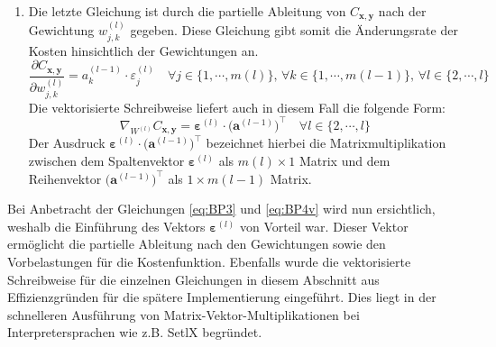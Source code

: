 \begin{enumerate}
\item Die letzte Gleichung ist durch die partielle Ableitung von $C_{\mathbf{x},\mathbf{y}}$ nach der Gewichtung $w_{j,k}^{(l)}$ gegeben. Diese Gleichung gibt somit die Änderungsrate der Kosten hinsichtlich der Gewichtungen an.
\begin{equation}
  \label{eq:BP4}
  \frac{\partial C_{\mathbf{x}, \mathbf{y}}}{\partial w_{j,k}^{(l)}} = a_k^{(l-1)} \cdot \varepsilon_j^{(l)}
  \quad \mbox{$\forall j \in \{1,\cdots,m(l)\}$, $\forall k \in \{1,\cdots,m(l-1)\}$, $\forall l \in \{2, \cdots,l\}$}
\end{equation}
Die vektorisierte Schreibweise liefert auch in diesem Fall die folgende Form:
\begin{equation}
  \label{eq:BP4v}
  \nabla_{W^{(l)}} C_{\mathbf{x}, \mathbf{y}} = \boldsymbol{\varepsilon}^{(l)} \cdot \bigl(\mathbf{a}^{(l-1)}\bigr)^\top
  \quad \mbox{$\forall l \in \{2, \cdots,l\}$}
\end{equation}
Der Ausdruck $\boldsymbol{\varepsilon}^{(l)} \cdot \bigl(\mathbf{a}^{(l-1)}\bigr)^\top$ bezeichnet hierbei die Matrixmultiplikation zwischen dem Spaltenvektor $\boldsymbol{\varepsilon}^{(l)}$ als $m(l) \times 1$ Matrix und dem Reihenvektor $\bigl(\mathbf{a}^{(l-1)}\bigr)^\top$ als $1 \times m(l-1)$ Matrix.
\end{enumerate}

\noindent
Bei Anbetracht der Gleichungen \ref{eq:BP3} und \ref{eq:BP4v} wird nun ersichtlich, weshalb die Einführung des Vektors $\boldsymbol{\varepsilon}^{(l)}$ von Vorteil war. Dieser Vektor ermöglicht die partielle Ableitung nach den Gewichtungen sowie den Vorbelastungen für die Kostenfunktion. Ebenfalls wurde die vektorisierte Schreibweise für die einzelnen Gleichungen in diesem Abschnitt aus Effizienzgründen für die spätere Implementierung eingeführt. Dies liegt in der schnelleren Ausführung von Matrix-Vektor-Multiplikationen bei Interpretersprachen wie z.B. SetlX begründet. \\

